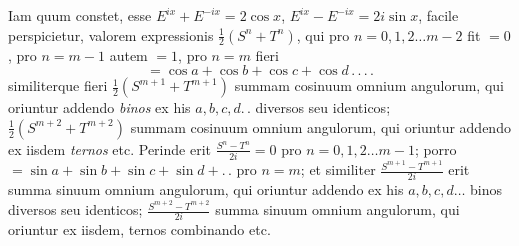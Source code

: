 Iam quum constet, esse $E^{ix}+E^{-ix}=2\cos x$, $E^{ix}-E^{-ix}=2i\sin x$, facile perspicietur, valorem expressionis $\frac12(S^n+T^n)$, qui pro $n=0,1,2\ldots m-2$ fit $=0$, pro $n=m-1$ autem $=1$, pro $n=m$ fieri
\[
=\cos a+\cos b+\cos c+\cos d\,.\,.\,.\,.
\]
similiterque fieri $\frac12(S^{m+1}+T^{m+1})$ summam cosinuum omnium angulorum, qui oriuntur addendo \textit{binos} ex his $a,b,c,d.\,.$ diversos seu identicos; $\frac12(S^{m+2}+T^{m+2})$ summam cosinuum omnium angulorum, qui oriuntur addendo ex iisdem \textit{ternos} etc. Perinde erit $\frac{S^n-T^n}{2i}=0$ pro $n=0,1,2\ldots m-1$; porro $=\sin a+\sin b+\sin c+\sin d+.\,.$ pro $n=m$; et similiter $\frac{S^{m+1}-T^{m+1}}{2i}$ erit summa sinuum omnium angulorum, qui oriuntur addendo ex his $a,b,c,d\ldots$ binos diversos seu identicos; $\frac{S^{m+2}-T^{m+2}}{2i}$ summa sinuum omnium angulorum, qui oriuntur ex iisdem, ternos combinando etc.

